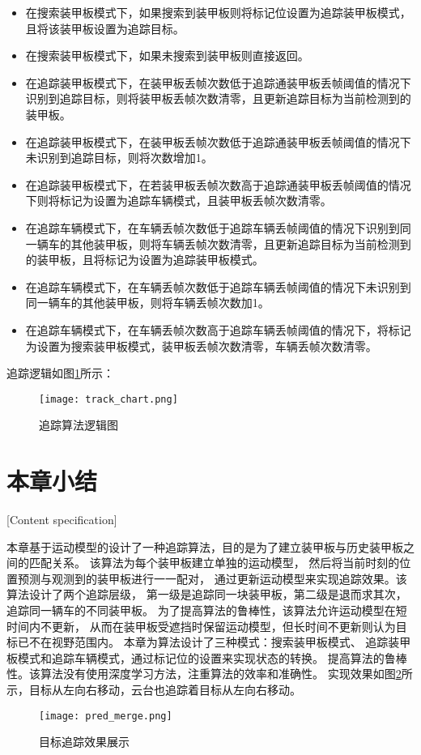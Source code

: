 \begin{itemize}[itemindent=2em]
\item 在搜索装甲板模式下，如果搜索到装甲板则将标记位设置为追踪装甲板模式，且将该装甲板设置为追踪目标。
\item 在搜索装甲板模式下，如果未搜索到装甲板则直接返回。
\item 在追踪装甲板模式下，在装甲板丢帧次数低于追踪通装甲板丢帧阈值的情况下识别到追踪目标，则将装甲板丢帧次数清零，且更新追踪目标为当前检测到的装甲板。
\item 在追踪装甲板模式下，在装甲板丢帧次数低于追踪通装甲板丢帧阈值的情况下未识别到追踪目标，则将次数增加1。
\item 在追踪装甲板模式下，在若装甲板丢帧次数高于追踪通装甲板丢帧阈值的情况下则将标记为设置为追踪车辆模式，且装甲板丢帧次数清零。
\item 在追踪车辆模式下，在车辆丢帧次数低于追踪车辆丢帧阈值的情况下识别到同一辆车的其他装甲板，则将车辆丢帧次数清零，且更新追踪目标为当前检测到的装甲板，且将标记为设置为追踪装甲板模式。
\item 在追踪车辆模式下，在车辆丢帧次数低于追踪车辆丢帧阈值的情况下未识别到同一辆车的其他装甲板，则将车辆丢帧次数加1。
\item 在追踪车辆模式下，在车辆丢帧次数高于追踪车辆丢帧阈值的情况下，将标记为设置为搜索装甲板模式，装甲板丢帧次数清零，车辆丢帧次数清零。
\end{itemize}

追踪逻辑如图\ref{追踪算法逻辑图}所示：

\begin{figure}[H]
    \centering
    \texttt{[image: track\_chart.png]} 
    \caption{追踪算法逻辑图} 
    \label{追踪算法逻辑图} 
\end{figure} 

\par


\section{本章小结}[Content specification]


本章基于运动模型的设计了一种追踪算法，目的是为了建立装甲板与历史装甲板之间的匹配关系。
该算法为每个装甲板建立单独的运动模型，
然后将当前时刻的位置预测与观测到的装甲板进行一一配对，
通过更新运动模型来实现追踪效果。该算法设计了两个追踪层级，
第一级是追踪同一块装甲板，第二级是退而求其次，追踪同一辆车的不同装甲板。
为了提高算法的鲁棒性，该算法允许运动模型在短时间内不更新，
从而在装甲板受遮挡时保留运动模型，但长时间不更新则认为目标已不在视野范围内。
本章为算法设计了三种模式：搜索装甲板模式、
追踪装甲板模式和追踪车辆模式，通过标记位的设置来实现状态的转换。
提高算法的鲁棒性。该算法没有使用深度学习方法，注重算法的效率和准确性。
实现效果如图\ref{pred_merge}所示，目标从左向右移动，云台也追踪着目标从左向右移动。

\begin{figure}[H]
    \centering
    \texttt{[image: pred\_merge.png]} 
    \caption{目标追踪效果展示} 
    \label{pred_merge} 
\end{figure} 